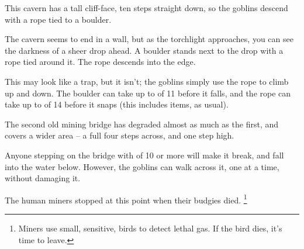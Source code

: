 \begin{multicols}{2}

\begin{exampletext}
  This cavern has a tall cliff-face, ten \glspl{step} straight down, so the goblins descend with a rope tied to a boulder.
\end{exampletext}

\begin{boxtext}
  The cavern seems to end in a wall, but as the torchlight approaches, you can see the darkness of a sheer drop ahead.
  A boulder stands next to the drop with a rope tied around it.
  The rope descends into the edge.
\end{boxtext}

This may look like a trap, but it isn't; the goblins simply use the rope to climb up and down.
The boulder can take up to  of 11 before it falls, and the rope can take up to  of 14 before it snaps (this includes items, as usual).




\begin{exampletext}
  The second old mining bridge has degraded almost as much as the first, and covers a wider area -- a full four \glspl{step} across, and one \gls{step} high.
\end{exampletext}

Anyone stepping on the bridge with  of 10 or more will make it break, and fall into the water below.
However, the goblins can walk across it, one at a time, without damaging it.





\begin{exampletext}
  The human miners stopped at this point when their budgies died.%
  \footnote{Miners use small, sensitive, birds to detect lethal gas.  If the bird dies, it's time to leave.}


\end{exampletext}
\end{multicols}
